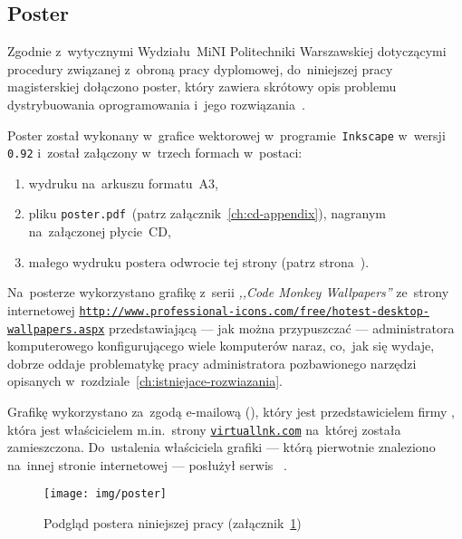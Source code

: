 \documentclass[thesis]{subfiles}
\begin{document}
\begin{appendices}
\chapter{Poster}
\label{ch:poster}

Zgodnie z~wytycznymi Wydziału~MiNI Politechniki Warszawskiej dotyczącymi procedury związanej z~obroną pracy dyplomowej, do~niniejszej pracy magisterskiej dołączono poster, który zawiera skrótowy opis problemu dystrybuowania oprogramowania i~jego rozwiązania~\cite{informacje-dot-obron}.

Poster został wykonany w~grafice wektorowej w~programie~\texttt{Inkscape} w~wersji \texttt{0.92} i~został załączony w~trzech formach w~postaci:
\begin{enumerate}
	\item wydruku na~arkuszu formatu~A3,
	\item pliku \mbox{\texttt{poster.pdf}}~(patrz załącznik~\ref{ch:cd-appendix}), nagranym na~załączonej płycie~CD,
	\item małego wydruku postera odwrocie tej strony (patrz strona~\pageref{fig:poster-preview}).
\end{enumerate}
Na~posterze wykorzystano grafikę z~serii \emph{,,Code Monkey Wallpapers''} ze~strony internetowej \texttt{\url{http://www.professional-icons.com/free/hotest-desktop-wallpapers.aspx}} przedstawiającą --- jak można przypuszczać --- administratora komputerowego konfigurującego wiele komputerów naraz, co,~jak się wydaje, dobrze oddaje problematykę pracy administratora pozbawionego narzędzi opisanych w~rozdziale~\ref{ch:istniejace-rozwiazania}.

Grafikę wykorzystano za~zgodą e-mailową  (), który jest przedstawicielem firmy , która jest właścicielem m.in.~strony \texttt{\url{virtuallnk.com}} na~której została zamieszczona. Do~ustalenia właściciela grafiki --- którą pierwotnie znaleziono na~innej stronie internetowej --- posłużył serwis ~\cite{tineye}.

\newpage
\begin{figure}[p]
	\centering
	\texttt{[image: img/poster]}
	\caption{Podgląd postera niniejszej pracy (załącznik~\ref{ch:poster})}
	\label{fig:poster-preview}
\end{figure}


\end{appendices}
\end{document}
